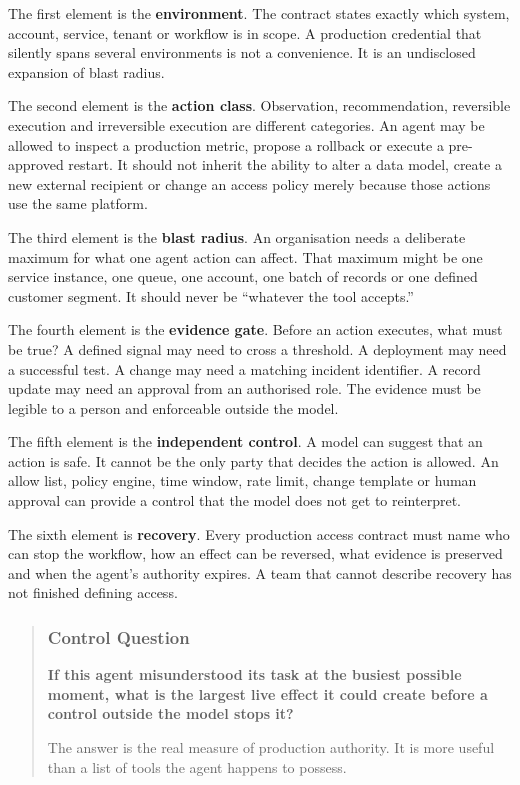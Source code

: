 The first element is the \textbf{environment}. The contract states
exactly which system, account, service, tenant or workflow is in scope.
A production credential that silently spans several environments is not
a convenience. It is an undisclosed expansion of blast radius.

The second element is the \textbf{action class}. Observation,
recommendation, reversible execution and irreversible execution are
different categories. An agent may be allowed to inspect a production
metric, propose a rollback or execute a pre-approved restart. It should
not inherit the ability to alter a data model, create a new external
recipient or change an access policy merely because those actions use
the same platform.

The third element is the \textbf{blast radius}. An organisation needs a
deliberate maximum for what one agent action can affect. That maximum
might be one service instance, one queue, one account, one batch of
records or one defined customer segment. It should never be ``whatever
the tool accepts.''

The fourth element is the \textbf{evidence gate}. Before an action
executes, what must be true? A defined signal may need to cross a
threshold. A deployment may need a successful test. A change may need a
matching incident identifier. A record update may need an approval from
an authorised role. The evidence must be legible to a person and
enforceable outside the model.

The fifth element is the \textbf{independent control}. A model can
suggest that an action is safe. It cannot be the only party that decides
the action is allowed. An allow list, policy engine, time window, rate
limit, change template or human approval can provide a control that the
model does not get to reinterpret.

The sixth element is \textbf{recovery}. Every production access contract
must name who can stop the workflow, how an effect can be reversed, what
evidence is preserved and when the agent's authority expires. A team
that cannot describe recovery has not finished defining access.

\begin{quote}
\subsubsection{Control Question}\label{control-question}

\textbf{If this agent misunderstood its task at the busiest possible
moment, what is the largest live effect it could create before a control
outside the model stops it?}

The answer is the real measure of production authority. It is more
useful than a list of tools the agent happens to possess.
\end{quote}

